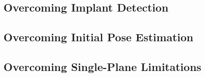 \subsection{Overcoming Implant Detection}

\subsection{Overcoming Initial Pose Estimation}

\subsection{Overcoming Single-Plane Limitations}